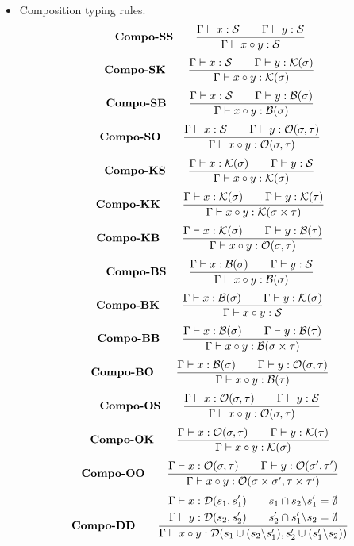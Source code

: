 \begin{itemize}
    \item Composition typing rules. 
    \[  \textbf{Compo-SS} \qquad
        \frac{\Gamma \vdash x : \mathcal{S} \qquad \Gamma \vdash y : \mathcal{S}}{\Gamma \vdash x \circ y : \mathcal{S}}
    \]
    \[  \textbf{Compo-SK} \qquad
        \frac{\Gamma \vdash x : \mathcal{S} \qquad \Gamma \vdash y : \mathcal{K}(\sigma)}{\Gamma \vdash x \circ y : \mathcal{K}(\sigma)}
    \]
    \[  \textbf{Compo-SB} \qquad
        \frac{\Gamma \vdash x : \mathcal{S} \qquad \Gamma \vdash y : \mathcal{B}(\sigma)}{\Gamma \vdash x \circ y : \mathcal{B}(\sigma)}
    \]
    \[  \textbf{Compo-SO} \qquad
        \frac{\Gamma \vdash x : \mathcal{S} \qquad \Gamma \vdash y : \mathcal{O}(\sigma, \tau)}{\Gamma \vdash x \circ y : \mathcal{O}(\sigma, \tau)}
    \]
    \[  \textbf{Compo-KS} \qquad
        \frac{\Gamma \vdash x : \mathcal{K}(\sigma) \qquad \Gamma \vdash y : \mathcal{S}}{\Gamma \vdash x \circ y : \mathcal{K}(\sigma)}
    \]
    \[  \textbf{Compo-KK} \qquad
        \frac{\Gamma \vdash x : \mathcal{K}(\sigma) \qquad \Gamma \vdash y : \mathcal{K}(\tau)}{\Gamma \vdash x \circ y : \mathcal{K}(\sigma \times \tau)}
    \]
    \[  \textbf{Compo-KB} \qquad
        \frac{\Gamma \vdash x : \mathcal{K}(\sigma) \qquad \Gamma \vdash y : \mathcal{B}(\tau)}{\Gamma \vdash x \circ y : \mathcal{O}(\sigma, \tau)}
    \]
    \[  \textbf{Compo-BS} \qquad
        \frac{\Gamma \vdash x : \mathcal{B}(\sigma) \qquad \Gamma \vdash y : \mathcal{S}}{\Gamma \vdash x \circ y : \mathcal{B}(\sigma)}
    \]
    \[  \textbf{Compo-BK} \qquad
        \frac{\Gamma \vdash x : \mathcal{B}(\sigma) \qquad \Gamma \vdash y : \mathcal{K}(\sigma)}{\Gamma \vdash x \circ y : \mathcal{S}}
    \]
    \[  \textbf{Compo-BB} \qquad
        \frac{\Gamma \vdash x : \mathcal{B}(\sigma) \qquad \Gamma \vdash y : \mathcal{B}(\tau)}{\Gamma \vdash x \circ y : \mathcal{B}(\sigma \times \tau)}
    \]
    \[  \textbf{Compo-BO} \qquad
        \frac{\Gamma \vdash x : \mathcal{B}(\sigma) \qquad \Gamma \vdash y : \mathcal{O}(\sigma, \tau)}{\Gamma \vdash x \circ y : \mathcal{B}(\tau)}
    \]
    \[  \textbf{Compo-OS} \qquad
        \frac{\Gamma \vdash x : \mathcal{O}(\sigma, \tau) \qquad \Gamma \vdash y : \mathcal{S}}{\Gamma \vdash x \circ y : \mathcal{O}(\sigma, \tau)}
    \]
    \[  \textbf{Compo-OK} \qquad
        \frac{\Gamma \vdash x : \mathcal{O}(\sigma, \tau) \qquad \Gamma \vdash y : \mathcal{K}(\tau)}{\Gamma \vdash x \circ y : \mathcal{K}(\sigma)}
    \]
    \[  \textbf{Compo-OO} \qquad
        \frac{\Gamma \vdash x : \mathcal{O}(\sigma, \tau) \qquad \Gamma \vdash y : \mathcal{O}(\sigma', \tau')}{\Gamma \vdash x \circ y : \mathcal{O}(\sigma \times \sigma', \tau \times \tau')}
    \]
    \[
        \textbf{Compo-DD} \qquad
        \frac{
            \begin{aligned}
                \Gamma \vdash x : \mathcal{D}(s_1,s_1') \\
                \Gamma \vdash y : \mathcal{D}(s_2,s_2')
            \end{aligned}
            \qquad 
            \begin{aligned}
                s_1 \cap s_2 \backslash s_1' = \emptyset \\
                s_2' \cap s_1' \backslash s_2 = \emptyset
            \end{aligned}
        }
        {\Gamma \vdash x\circ y : \mathcal{D}(s_1 \cup (s_2\backslash s_1'), s_2' \cup (s_1'\backslash s_2))}
    \]



\end{itemize}
